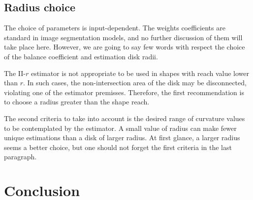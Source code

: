 \subsection{Radius choice}

The choice of parameters is input-dependent. The weights coefficients are standard in image segmentation models, and no further discussion of them will take place here. However, we are going to say few words with respect the choice of the balance coefficient and estimation disk radii.

The II-$r$ estimator is not appropriate to be used in shapes with reach value lower than $r$. In such cases, the non-intersection area of the disk may be disconnected, violating one of the estimator premisses. Therefore, the first recommendation is to choose a radius greater than the shape reach.

The second criteria to take into account is the desired range of curvature values to be contemplated by the estimator. A small value of radius can make fewer unique estimations than a disk of larger radius. At first glance, a larger radius seems a better choice, but one should not forget the first criteria in the last paragraph.





\section{Conclusion}




